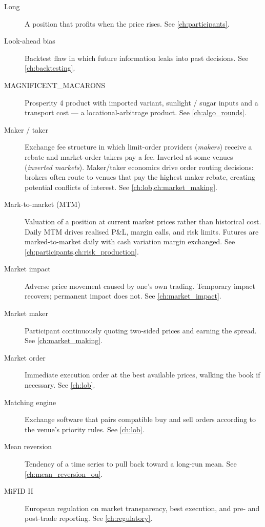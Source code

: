 \begin{description}
\item[Long]
A position that profits when the price rises. See \cref{ch:participants}.

\item[Look-ahead bias]
Backtest flaw in which future information leaks into past decisions. See \cref{ch:backtesting}.

\item[MAGNIFICENT\_MACARONS]
Prosperity 4 product with imported variant, sunlight / sugar inputs and
a transport cost --- a locational-arbitrage product. See \cref{ch:algo_rounds}.

\item[Maker / taker]
Exchange fee structure in which limit-order providers (\emph{makers})
receive a rebate and market-order takers pay a fee. Inverted at some
venues (\emph{inverted markets}). Maker/taker economics drive order
routing decisions: brokers often route to venues that pay the highest
maker rebate, creating potential conflicts of interest.
See \cref{ch:lob,ch:market_making}.

\item[Mark-to-market (MTM)]
Valuation of a position at current market prices rather than historical
cost. Daily MTM drives realised P\&L, margin calls, and risk limits.
Futures are marked-to-market daily with cash variation margin exchanged.
See \cref{ch:participants,ch:risk_production}.

\item[Market impact]
Adverse price movement caused by one's own trading. Temporary impact
recovers; permanent impact does not. See \cref{ch:market_impact}.

\item[Market maker]
Participant continuously quoting two-sided prices and earning the
spread. See \cref{ch:market_making}.

\item[Market order]
Immediate execution order at the best available prices, walking the
book if necessary. See \cref{ch:lob}.

\item[Matching engine]
Exchange software that pairs compatible buy and sell orders according
to the venue's priority rules. See \cref{ch:lob}.

\item[Mean reversion]
Tendency of a time series to pull back toward a long-run mean. See \cref{ch:mean_reversion_ou}.

\item[MiFID II]
European regulation on market transparency, best execution, and pre-
and post-trade reporting. See \cref{ch:regulatory}.


\end{description}
